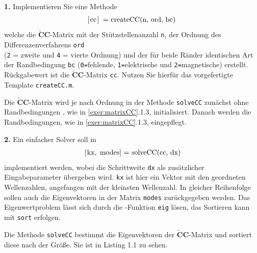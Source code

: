 \documentclass[Protokollheft.tex]{subfiles}
\begin{document}
	\begin{framed}
		\noindent \textbf{1.} Implementieren Sie eine Methode
		\begin{align}
			\lstinline{[cc] = createCC(n, ord, bc)}\; \label{meth:createCC}
		\end{align}     
		welche die $\tilde{\textbf{C}}\textbf{C}$-Matrix mit der Stützstellenanzahl \lstinline{n}, der Ordnung des Differenzenverfahrens
		\lstinline{ord}\\ (\lstinline{2} = zweite und \lstinline{4} = vierte Ordnung) und der für beide Ränder identischen Art der Randbedingung \lstinline{bc} (\lstinline{0=}fehlende, \lstinline{1=}elektrische und  \lstinline{2=}magnetische) erstellt.
		Rückgabewert ist die $\tilde{\textbf{C}}\textbf{C}$-Matrix \lstinline{cc}. Nutzen Sie hierfür das vorgefertigte Template \lstinline{createCC.m}.\label{exer:createCC}
	\end{framed}
	Die $\tilde{\textbf{C}}\textbf{C}$-Matrix wird je nach Ordnung in der Methode \lstinline{solveCC} zunächst ohne Randbedingungen , wie in \ref{exer:matrixCC}.1.3, initialisiert. Danach werden die Randbedingungen, wie in \ref{exer:matrixCC}.1.3, eingepflegt.
	
	\begin{framed}
		\noindent \textbf{2.} Ein einfacher Solver soll in
		\begin{align}
			\lstinline{[kx, modes] = solveCC(cc, dx)} \label{meth:solveCC}
		\end{align}
		implementiert werden, wobei die Schrittweite \lstinline{dx} als zusätzlicher Eingabeparameter übergeben wird.
		\lstinline{kx} ist hier ein Vektor mit den geordneten Wellenzahlen, angefangen mit der kleinsten Wellenzahl. In gleicher
		Reihenfolge sollen auch die Eigenvektoren in der Matrix \lstinline{modes} zurückgegeben werden.
		Das Eigenwertproblem lässt sich durch die \matlab-Funktion \lstinline{eig} lösen, das Sortieren kann mit \lstinline{sort} erfolgen.\label{exer:solveCC}
	\end{framed}
	Die Methode \lstinline{solveCC} bestimmt die Eigenvektoren der $\tilde{\textbf{C}}\textbf{C}$-Matrix und sortiert diese nach der Größe. Sie ist in Listing 1.1 zu sehen.
	
	
\end{document}
